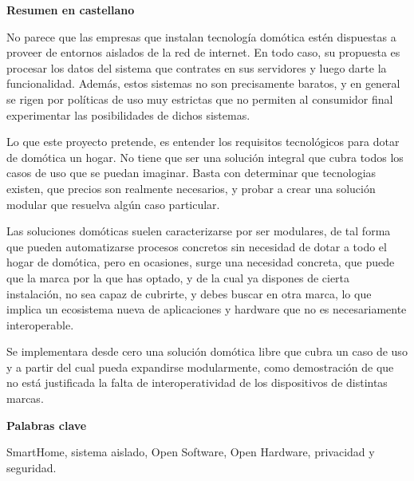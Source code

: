 
\newpage

\thispagestyle{empty}

\begin{center}

{\bf \Huge Resumen en castellano}

  \end{center}
\vspace{1cm}

No parece que las empresas que instalan tecnología domótica estén dispuestas a proveer de entornos aislados de la red de internet. En todo caso, su propuesta es procesar los datos del sistema que contrates en sus servidores y luego darte la funcionalidad. Además, estos sistemas no son precisamente baratos, y en general se rigen por políticas de uso muy estrictas que no permiten al consumidor final experimentar las posibilidades de dichos sistemas.

\vspace{0.5cm}

Lo que este proyecto pretende, es entender los requisitos tecnológicos para dotar de domótica un hogar. No tiene que ser una solución integral que cubra todos los casos de uso que se puedan imaginar. Basta con determinar que tecnologias existen, que precios son realmente necesarios, y probar a crear una solución modular que resuelva algún caso particular.

\vspace{0.5cm}

Las soluciones domóticas suelen caracterizarse por ser modulares, de tal forma que pueden automatizarse procesos concretos sin necesidad de dotar a todo el hogar de domótica, pero en ocasiones, surge una necesidad concreta, que puede que la marca por la que has optado, y de la cual ya dispones de cierta instalación, no sea capaz de cubrirte, y debes buscar en otra marca, lo que implica un ecosistema nueva de aplicaciones y hardware que no es necesariamente interoperable.

\vspace{0.5cm}

Se implementara desde cero una solución domótica libre que cubra un caso de uso y a partir del cual pueda expandirse modularmente, como demostración de que no está justificada la falta de interoperatividad de los dispositivos de distintas marcas.


\vspace{1cm}


\begin{center}

{\bf \Large Palabras clave}

   \end{center}

   \vspace{0.5cm}

   SmartHome, sistema aislado, Open Software, Open Hardware, privacidad y seguridad.
